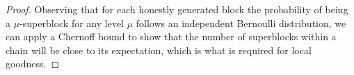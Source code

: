 \begin{proof}
Observing that for each honestly generated block the probability of being a
$\mu$-superblock for any level $\mu$ follows an independent Bernoulli
distribution, we can apply a Chernoff bound to show that the number of
superblocks within a chain will be close to its expectation, which is what
is required for local goodness.
\Qed
\end{proof}

